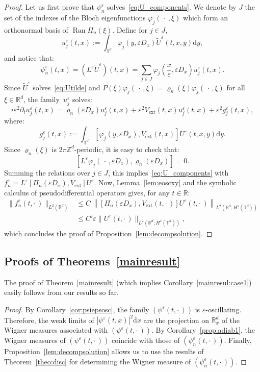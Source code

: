 \documentclass[AHL,Unicode,longabstracts]{cedram}
\DeclareMathOperator{\ext}{ext}
\DeclareMathOperator{\Ran}{Ran}
\newcommand*\R{{\mathbb R}}
\newcommand*\Z{{\mathbb Z}}
\newcommand*\T{{\mathbb T}}
\newcommand*\eps{\varepsilon}
\numberwithin{equation}{section}
\newcommand*{\dd}{\mathrm{d}}
\newcommand*{\dx}{\dd x}
\newcommand*{\dy}{\dd y}
\begin{document}
\begin{proof}
Let us first prove that $\psi_n^\eps$ solves~\eqref{eq:U_components}. We denote by $J$ the set of the indexes of the Bloch eigenfunctions $\varphi_j(\,\cdot\,,\xi)$ which form an orthonormal basis of $\Ran\Pi_n(\xi)$.
Define for $j\in J$,
\[
u^\eps_j(t,x):=\int_{\T^d} \overline \varphi_j(y,\eps D_x) \widetilde U^\eps(t,x,y) \dy,
\]
and notice that:
\[
\psi^\eps_n(t,x)=(L^\eps \widetilde U^\eps)(t,x)=\sum_{j\in J} \varphi_j\left(\frac{x}{\eps},\eps D_x\right) u^\eps_j(t,x).
\]
Since $\widetilde U^\eps$ solves~\eqref{eq:Utilde} and $P(\xi) \varphi_j(\,\cdot\,,\xi) = \varrho_n(\xi) \varphi_j(\,\cdot\,,\xi)$ for all $\xi\in\R^d$, the family~$u^\eps_j$ solves:
\[
i\eps^2\partial_t u^\eps_j (t,x)= \varrho_n(\eps D_x) u^\eps_j(t,x)+ \eps ^2 V_{\ext}(t,x) u^\eps_j(t,x)+\eps^2 g_j^\eps(t,x),
\]
where:
\[
g^\eps_j(t,x):=\int_{\T^d}[\overline{\varphi_j}(y,\eps D_x),V_{\ext}(t,x)]U^\eps (t,x,y)\dy.
\]
Since $\varrho_n(\xi)$ is $2\pi\Z^d$-periodic, it is easy to check that:
\[
[L^\eps\varphi_j(\,\cdot\,,\eps D_x),\varrho_n(\eps D_x)]=0.
\]
Summing the relations over $j\in J$, this implies~\eqref{eq:U_components} with $ f^\eps_n = L^\eps [\Pi_n(\eps D_x), V_{\ext}] U^\eps. $ Now, Lemma~\ref{lem:eoscxy} and the symbolic calculus of pseudodifferential operators gives, for any $t\in\R$:
\begin{align*}
\| f^\eps_n(t,\cdot\,)\|_{L^2(\R^d)}
&\leq C\, \left\| [\Pi_n(\eps D_x), V_{\ext} (t,\cdot\,)] U^\eps(t,\cdot\,)\right\|_{L^2(\R^d;H^s(\T^d))}\\
&\leq C'\eps \|U^\eps(t,\cdot\,)\|_{L^2(\R^d;H^s(\T^d))},
\end{align*}
which concludes the proof of Proposition~\ref{lem:decompsolution}.
\end{proof}



\subsection{Proofs of Theorems~\ref{mainresult}}


The proof of Theorem~\ref{mainresult} (which implies Corollary~\ref{mainresul:case1}) easily follows from our results so far.

\begin{proof}
By Corollary~\ref{cor:psiepsosc}, the family $(\psi^\eps(t,\cdot\,))$ is $\eps$-oscillating. Therefore, the weak limits of $|\psi^\eps(t,x)|^2\dx$ are the projection on $\R^d_x$ of the Wigner measures associated with $(\psi^\eps(t,\cdot\,))$. By Corollary~\ref{prop:adiab1}, the Wigner measures of $(\psi^\eps(t,\cdot\,))$ coincide with those of $(\psi^\eps_n(t,\cdot\,))$. Finally,
Proposition~\ref{lem:decompsolution} allows us to use the results of Theorem~\ref{theo:disc} for determining the Wigner measure of $(\psi^\eps_n(t,\cdot\,))$.
\end{proof}
\end{document}

